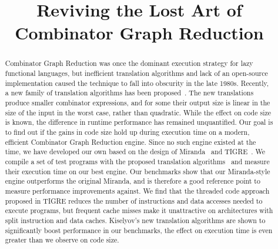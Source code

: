 \documentclass[conference]{IEEEtran}
\begin{document}
\title{Reviving the Lost Art of \\Combinator Graph Reduction}

\author{
}

\maketitle

\begin{abstract}
    Combinator Graph Reduction was once the dominant execution strategy for lazy functional languages, but inefficient translation algorithms and lack of an open-source implementation caused the technique to fall into obscurity in the late 1980s.
    Recently, a new family of translation algorithms has been proposed~\cite{kiselyov_lambda_2018}.
    The new translations produce smaller combinator expressions, and for some their output size is linear in the size of the input in the worst case, rather than quadratic.
    While the effect on code size is known, the difference in runtime performance has remained unquantified.
    Our goal is to find out if the gains in code size hold up during execution time on a modern, efficient Combinator Graph Reduction engine.
    Since no such engine existed at the time, we have developed our own based on the design of Miranda~\cite{turner_miranda_1985} and TIGRE~\cite{koopman_fresh_1989}.
    We compile a set of test programs with the proposed translation algorithms~\cite{kiselyov_lambda_2018} and measure their execution time on our best engine.
    Our benchmarks show that our Miranda-style engine outperforms the original Miranda, and is therefore a good reference point to measure performance improvements against.
    We find that the threaded code approach proposed in TIGRE reduces the number of instructions and data accesses needed to execute programs, but frequent cache misses make it unattractive on architectures with split instruction and data caches.
    Kiselyov's new translation algorithms are shown to significantly boost performance in our benchmarks, the effect on execution time is even greater than we observe on code size.

\end{abstract}
\end{document}
